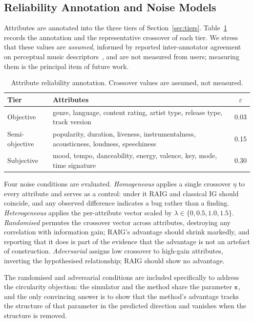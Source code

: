 \documentclass[conference]{IEEEtran}
\begin{document}
\subsection{Reliability Annotation and Noise Models}

Attributes are annotated into the three tiers of Section~\ref{sec:tiers}.
Table~\ref{tab:tiers} records the annotation and the representative crossover
of each tier. We stress that these values are \emph{assumed}, informed by
reported inter-annotator agreement on perceptual music
descriptors~\cite{hu2007mood,kim2010emotion}, and are not measured from users;
measuring them is the principal item of future work.

\begin{table}[t]
\caption{Attribute reliability annotation. Crossover values are assumed, not
measured.}
\label{tab:tiers}
\centering
\footnotesize
\begin{tabular}{@{}lp{}c@{}}
\toprule
\textbf{Tier} & \textbf{Attributes} & \textbf{$\varepsilon$} \\
\midrule
Objective & genre, language, content rating, artist type, release type, track version & 0.03 \\
Semi-objective & popularity, duration, liveness, instrumentalness, acousticness, loudness, speechiness & 0.15 \\
Subjective & mood, tempo, danceability, energy, valence, key, mode, time signature & 0.30 \\
\bottomrule
\end{tabular}
\end{table}

Four noise conditions are evaluated. \emph{Homogeneous} applies a single
crossover $\eta$ to every attribute and serves as a control: under it RAIG and
classical IG should coincide, and any observed difference indicates a bug
rather than a finding. \emph{Heterogeneous} applies the per-attribute vector
scaled by $\lambda \in \{0, 0.5, 1.0, 1.5\}$. \emph{Randomised} permutes the
crossover vector across attributes, destroying any correlation with information
gain; RAIG's advantage should shrink markedly, and reporting that it does is
part of the evidence that the advantage is not an artefact of construction.
\emph{Adversarial} assigns low crossover to high-gain attributes, inverting the
hypothesised relationship; RAIG should show no advantage.

The randomised and adversarial conditions are included specifically to address
the circularity objection: the simulator and the method share the parameter
$\boldsymbol\varepsilon$, and the only convincing answer is to show that the
method's advantage tracks the structure of that parameter in the predicted
direction and vanishes when the structure is removed.
\end{document}

